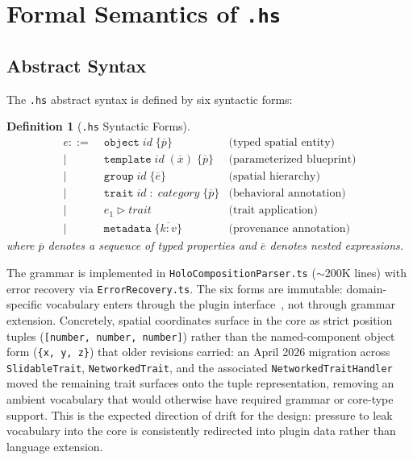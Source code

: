 \documentclass[sigconf,nonacm]{acmart}
\newcommand{\hscore}{\texttt{.hs}}
\newtheorem{definition}{Definition}
\begin{document}
\section{Formal Semantics of \hscore{}}
\label{sec:semantics}

\subsection{Abstract Syntax}

The \hscore{} abstract syntax is defined by six syntactic forms:

\begin{definition}[\hscore{} Syntactic Forms]
\begin{align*}
  e ::=\; & \texttt{object}\;\mathit{id}\;\{\overline{p}\}
           & \text{(typed spatial entity)} \\
        | & \texttt{template}\;\mathit{id}\;(\overline{x})\;\{\overline{p}\}
           & \text{(parameterized blueprint)} \\
        | & \texttt{group}\;\mathit{id}\;\{\overline{e}\}
           & \text{(spatial hierarchy)} \\
        | & \texttt{trait}\;\mathit{id}\;:\;\mathit{category}\;\{\overline{p}\}
           & \text{(behavioral annotation)} \\
        | & e_1 \triangleright \mathit{trait}
           & \text{(trait application)} \\
        | & \texttt{metadata}\;\{\overline{k{:}v}\}
           & \text{(provenance annotation)}
\end{align*}
where $\overline{p}$ denotes a sequence of typed properties and
$\overline{e}$ denotes nested expressions.
\end{definition}

The grammar is implemented in
\texttt{HoloCompositionParser.ts} ($\sim$200K lines) with error
recovery via \texttt{ErrorRecovery.ts}. The six forms are
immutable: domain-specific vocabulary enters through the plugin
interface~\cite{paper-12-holo-i3d2027}, not through grammar
extension. Concretely, spatial coordinates surface in the core
as strict position tuples
(\texttt{[number,~number,~number]}) rather than the
named-component object form (\texttt{\{x,\,y,\,z\}}) that older
revisions carried: an April 2026 migration across
\texttt{SlidableTrait}, \texttt{NetworkedTrait}, and the
associated \texttt{NetworkedTraitHandler} moved the remaining
trait surfaces onto the tuple representation, removing an
ambient vocabulary that would otherwise have required grammar
or core-type support. This is the expected direction of drift
for the design: pressure to leak vocabulary into the core is
consistently redirected into plugin data rather than language
extension.
\end{document}
